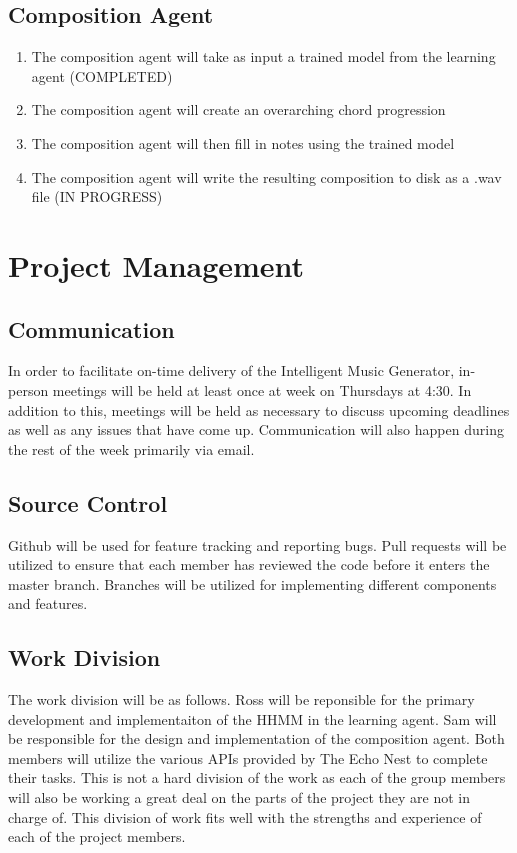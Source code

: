 \documentclass{article}
\begin{document}
\subsection{Composition Agent}
\begin{enumerate}
\item The composition agent will take as input a trained model from the learning agent (COMPLETED)
\item The composition agent will create an overarching chord progression
\item The composition agent will then fill in notes using the trained model
\item The composition agent will write the resulting composition to disk as a .wav file (IN PROGRESS)
\end{enumerate}

\section{Project Management}
\subsection{Communication}
In order to facilitate on-time delivery of the Intelligent Music Generator, in-person meetings 
will be held at least once at week on Thursdays at 4:30. In addition to this, meetings will be 
held as necessary to discuss upcoming deadlines as well as any issues that have come up. 
Communication will also happen during the rest of the week primarily via email.


\subsection{Source Control}
Github will be used for feature tracking and reporting bugs.  Pull requests will be utilized to 
ensure that each member has reviewed the code before it enters the master branch.  Branches will 
be utilized for implementing different components and features.

\subsection{Work Division}
The work division will be as follows. Ross will be reponsible for the primary development and 
implementaiton of the HHMM in the learning agent. Sam will be responsible for the design and 
implementation of the composition agent. Both members will utilize the various APIs provided by
The Echo Nest to complete their tasks.  This is not a hard division of the work as each of 
the group members will also be working a great deal on the parts of the project they are not in
charge of. This division of work fits well with the strengths and experience of each of the 
project members.
\end{document}
